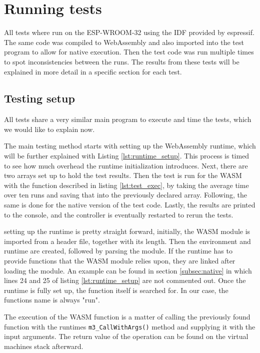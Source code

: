\section{Running tests}
All tests where run on the ESP-WROOM-32 using the IDF provided by espressif. The same code was compiled to WebAssembly and also imported into the test program to allow for native execution. Then the test code was run multiple times to spot inconsistencies between the runs. The results from these tests will be explained in more detail in a specific section for each test.
\subsection{Testing setup}\label{subsec:testing_setup}
All tests share a very similar main program to execute and time the tests, which we would like to explain now.

The main testing method starts with setting up the WebAssembly runtime, which will be further explained with Listing \ref{lst:runtime_setup}. This process is timed to see how much overhead the runtime initialization introduces. Next, there are two arrays set up to hold the test results. Then the test is run for the WASM with the function described in listing \ref{lst:test_exec}, by taking the average time over ten runs and saving that into the previously declared array. Following, the same is done for the native version of the test code. Lastly, the results are printed to the console, and the controller is eventually restarted to rerun the tests.

setting up the runtime is pretty straight forward, initially, the WASM module is imported from a header file, together with its length. Then the environment and runtime are created, followed by parsing the module. If the runtime has to provide functions that the WASM module relies upon, they are linked after loading the module. An example can be found in section \ref{subsec:native} in which lines 24 and 25 of listing \ref{lst:runtime_setup} are not commented out. Once the runtime is fully set up, the function itself is searched for. In our case, the functions name is always "run".

The execution of the WASM function is a matter of calling the previously found function with the runtimes \lstinline{m3_CallWithArgs()} method and supplying it with the input arguments. The return value of the operation can be found on the virtual machines stack afterward.

